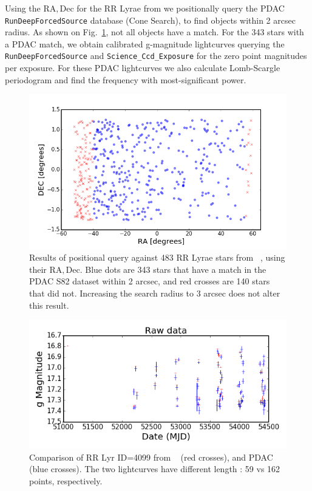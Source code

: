 \documentclass[fleqn,usenatbib]{mnras} %
\begin{document}
Using the $\mathrm{RA}, \mathrm{Dec}$ for the RR Lyrae  from \cite{sesar2010} we positionally query the PDAC  \verb|RunDeepForcedSource| database (Cone Search), to find objects within 2 arcsec radius. As shown on Fig.~\ref{fig:PDAC_query_ra_dec}, not all objects have a match.  For the 343 stars with a PDAC match, we obtain calibrated g-magnitude lightcurves querying the \verb|RunDeepForcedSource| and \verb|Science_Ccd_Exposure| for the zero point magnitudes per exposure. For these PDAC lightcurves we also calculate Lomb-Scargle periodogram and find the frequency with most-significant power. %


\begin{figure}
\includegraphics[width=\columnwidth]{figs/missing_and_recovered_RR_Lyr_PDAC}
\caption{Results of positional query against 483 RR Lyrae stars from ~\citep{sesar2010}, using their $\mathrm{RA}, \mathrm{Dec}$. Blue dots are 343 stars that have a match in the PDAC S82 dataset within 2 arcsec, and red crosses are 140 stars that did not. Increasing the search radius to 3 arcsec does not alter this result. }
\label{fig:PDAC_query_ra_dec}
\end{figure}

\begin{figure}
\includegraphics[width=\columnwidth]{figs/Sesar_vs_PDAC_lc_4099}
\caption{Comparison of RR Lyr ID=4099  from  ~\citep{sesar2010}  (red crosses), and PDAC (blue crosses).  The two lightcurves have different length : 59 vs 162 points, respectively.}
\label{fig:PDAC_SDSS_compare_LC}
\end{figure}
\end{document}
